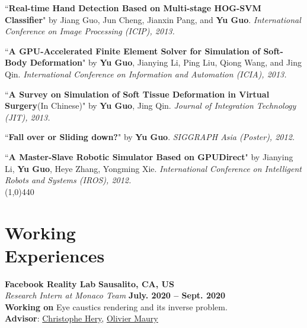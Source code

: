 \documentclass[margin,line]{resume}
\begin{document}
\begin{resume}
    \vspace{-5mm}

    ``\textbf{Real-time Hand Detection Based on Multi-stage HOG-SVM Classifier}" 
    by Jiang Guo, Jun Cheng, Jianxin Pang, and \textbf{Yu Guo}. 
    \textsl{International Conference on Image Processing (ICIP), 2013.}\\

    \vspace{-5mm}

    ``\textbf{A GPU-Accelerated Finite Element Solver for Simulation of Soft-Body Deformation}" 
    by \textbf{Yu Guo}, Jianying Li, Ping Liu, Qiong Wang, and Jing Qin. 
    \textsl{International Conference on Information and Automation (ICIA), 2013.}\\

    \vspace{-5mm}

    ``\textbf{A Survey on Simulation of Soft Tissue Deformation in Virtual Surgery}(In Chinese)" 
    by \textbf{Yu Guo}, Jing Qin. 
    \textsl{Journal of Integration Technology (JIT), 2013.}\\

    \vspace{-5mm}

    ``\textbf{Fall over or Sliding down?}" 
    by \textbf{Yu Guo}.
    \textsl{SIGGRAPH Asia (Poster), 2012.}\\

    \vspace{-5mm}

    ``\textbf{A Master-Slave Robotic Simulator Based on GPUDirect}" 
    by Jianying Li, \textbf{Yu Guo}, Heye Zhang, Yongming Xie.
    \textsl{International Conference on Intelligent Robots and Systems (IROS), 2012.}\\


    \vspace{-5.0mm}
    \line(1,0){440}
    \vspace{-5.0mm}

    \section{\mysidestyle Working \\Experiences}

	\textbf{Facebook Reality Lab} \hfill \textbf{Sausalito, CA, US} \\
	\textsl{Research Intern at Monaco Team} \hfill \textbf{July. 2020 -- Sept. 2020}\\
	\textbf{Working on} Eye caustics rendering and its inverse problem.\\
	\textbf{Advisor}: \href{https://graphics.pixar.com/library/indexAuthorChristophe_Hery.html}{Christophe Hery}, \href{https://www.imdb.com/name/nm1436524/}{Olivier Maury}       


\end{resume}
\end{document}

